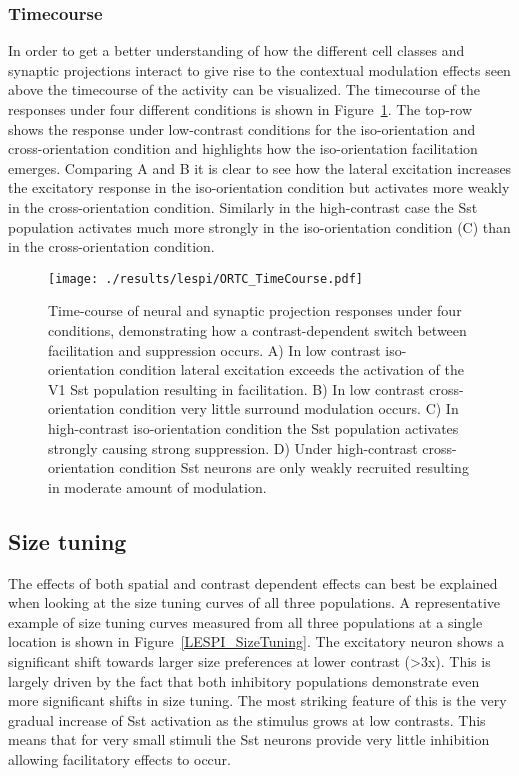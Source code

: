 \subsubsection{Timecourse}

In order to get a better understanding of how the different cell
classes and synaptic projections interact to give rise to the
contextual modulation effects seen above the timecourse of the
activity can be visualized. The timecourse of the responses under four
different conditions is shown in Figure~\ref{ORTC_TimeCourse}. The
top-row shows the response under low-contrast conditions for the
iso-orientation and cross-orientation condition and highlights how the
iso-orientation facilitation emerges. Comparing A and B it is clear to
see how the lateral excitation increases the excitatory response in
the iso-orientation condition but activates more weakly in the
cross-orientation condition. Similarly in the high-contrast case the
Sst population activates much more strongly in the iso-orientation
condition (C) than in the cross-orientation condition.

\begin{figure}
	\centering
        \texttt{[image: ./results/lespi/ORTC\_TimeCourse.pdf]}
	\caption[Time-course of neural and synaptic projection responses
      under four conditions, demonstrating how a contrast-dependent
      switch between facilitation and suppression occurs]{Time-course
      of neural and synaptic projection responses under four
      conditions, demonstrating how a contrast-dependent switch
      between facilitation and suppression occurs. A) In low contrast
      iso-orientation condition lateral excitation exceeds the
      activation of the V1 Sst population resulting in
      facilitation. B) In low contrast cross-orientation condition
      very little surround modulation occurs. C) In high-contrast
      iso-orientation condition the Sst population activates strongly
      causing strong suppression. D) Under high-contrast
      cross-orientation condition Sst neurons are only weakly
      recruited resulting in moderate amount of modulation.}
	\label{ORTC_TimeCourse}
\end{figure}

\subsection{Size tuning}

The effects of both spatial and contrast dependent effects can best be
explained when looking at the size tuning curves of all three
populations. A representative example of size tuning curves measured
from all three populations at a single location is shown in
Figure~\ref{LESPI_SizeTuning}. The excitatory neuron shows a
significant shift towards larger size preferences at lower contrast
(>3x). This is largely driven by the fact that both inhibitory
populations demonstrate even more significant shifts in size
tuning. The most striking feature of this is the very gradual increase
of Sst activation as the stimulus grows at low contrasts. This means
that for very small stimuli the Sst neurons provide very little
inhibition allowing facilitatory effects to occur.

